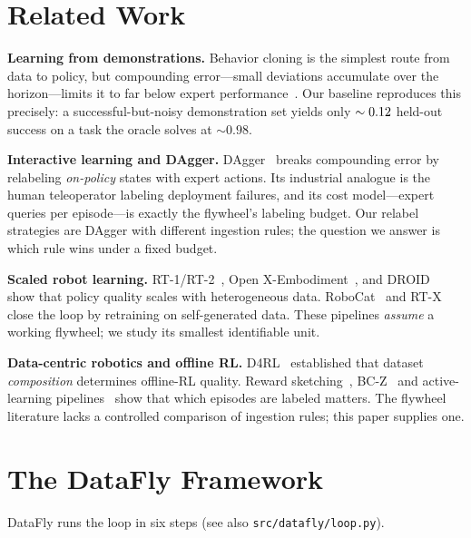 \documentclass[conference]{IEEEtran}
\begin{document}
\section{Related Work}
\textbf{Learning from demonstrations.} Behavior cloning is the simplest
route from data to policy, but compounding error---small deviations
accumulate over the horizon---limits it to far below expert
performance~\cite{ross2010efficient,pomerleau1989}. Our baseline reproduces
this precisely: a successful-but-noisy demonstration set yields only
$\sim0.12$ held-out success on a task the oracle solves at
$\sim0.98$.

\textbf{Interactive learning and DAgger.} DAgger~\cite{ross2011dagger}
breaks compounding error by relabeling \emph{on-policy} states with expert
actions. Its industrial analogue is the human teleoperator labeling
deployment failures, and its cost model---expert queries per episode---is
exactly the flywheel's labeling budget. Our relabel strategies are DAgger
with different ingestion rules; the question we answer is which rule wins
under a fixed budget.

\textbf{Scaled robot learning.} RT-1/RT-2~\cite{brohan2022rt1,brohan2023rt2},
Open X-Embodiment~\cite{openx2024}, and DROID~\cite{droid2024} show that
policy quality scales with heterogeneous data. RoboCat~\cite{schwarzer2023}
and RT-X close the loop by retraining on self-generated data. These
pipelines \emph{assume} a working flywheel; we study its smallest
identifiable unit.

\textbf{Data-centric robotics and offline RL.} D4RL~\cite{fu2020d4rl}
established that dataset \emph{composition} determines offline-RL quality.
Reward sketching~\cite{cabi2019scaling}, BC-Z~\cite{jang2022bc} and
active-learning pipelines~\cite{zhu2018robot} show that which episodes are
labeled matters. The flywheel literature lacks a controlled comparison of
ingestion rules; this paper supplies one.

\section{The DataFly Framework}
DataFly runs the loop in six steps (see also
\verb|src/datafly/loop.py|).
\end{document}
